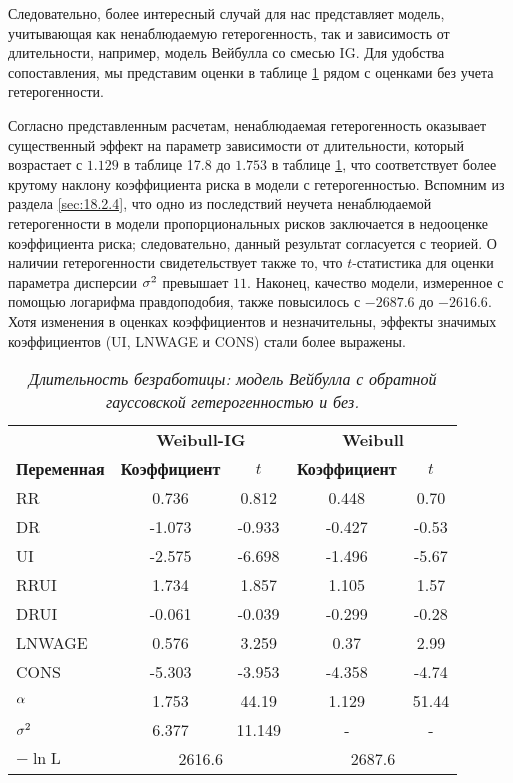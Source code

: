 Следовательно, более интересный случай для нас представляет модель, учитывающая как ненаблюдаемую гетерогенность, так и зависимость от длительности, например, модель Вейбулла со смесью IG. Для удобства сопоставления, мы представим оценки в таблице \ref{tab:18.2} рядом с оценками без учета гетерогенности.

Согласно представленным расчетам, ненаблюдаемая гетерогенность оказывает существенный эффект на параметр зависимости от длительности, который возрастает с $1.129$ в таблице 17.8 %
до $1.753$ в таблице \ref{tab:18.2}, что соответствует более крутому наклону коэффициента риска в модели с гетерогенностью. Вспомним из раздела \ref{sec:18.2.4}, что одно из последствий неучета ненаблюдаемой гетерогенности в модели пропорциональных рисков заключается в недооценке коэффициента риска; следовательно, данный результат согласуется с теорией. О наличии гетерогенности свидетельствует также то, что $t$-статистика для оценки параметра дисперсии $\sigma^2$ превышает $11$. Наконец, качество модели, измеренное с помощью логарифма правдоподобия, также повысилось с $-2687.6$ до $-2616.6$. Хотя изменения в оценках коэффициентов и незначительны, эффекты значимых коэффициентов (UI, LNWAGE и CONS) стали более выражены.

    \begin{table}[!htbp]\caption{\textit{Длительность безработицы: модель Вейбулла с обратной гауссовской гетерогенностью и без.}}\label{tab:18.2}
    \begin{center}
\begin{tabular}{lcccc}
\hline \hline
&\multicolumn{2}{c}{\textbf{Weibull-IG}}&\multicolumn{2}{c}{\textbf{Weibull}}\\
\cmidrule(r){2-3}\cmidrule(r){4-5}
\textbf{Переменная} &\textbf{Коэффициент}   &$t$      &\textbf{Коэффициент}   &$t$ \\
\hline
RR                  &0.736  &0.812  &0.448  &0.70 \\
DR                  &-1.073 &-0.933 &-0.427 &-0.53 \\
UI                  &-2.575 &-6.698 &-1.496 &-5.67 \\
RRUI                &1.734  &1.857  &1.105  &1.57 \\
DRUI                &-0.061 &-0.039 &-0.299 &-0.28 \\
LNWAGE              &0.576  &3.259  &0.37   &2.99 \\
CONS                &-5.303 &-3.953 &-4.358 &-4.74 \\
$\alpha$               &1.753  &44.19  &1.129  &51.44 \\
$\sigma^2$              &6.377  &11.149 &-      &- \\
$-\ln\textrm{L}$    &\multicolumn{2}{c}{2616.6}&\multicolumn{2}{c}{2687.6} \\
\hline \hline
\end{tabular}
    \end{center}
    \end{table}

